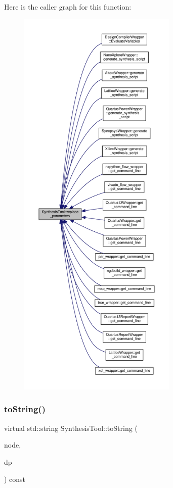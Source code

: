 Here is the caller graph for this function\+:
\nopagebreak
\begin{figure}[H]
\begin{center}
\leavevmode
\includegraphics[height=550pt]{d9/de0/classSynthesisTool_a96fbad52c8ebfe4b2685c2f47d824fa2_icgraph}
\end{center}
\end{figure}
\mbox{\label{classSynthesisTool_a98c5ba46f950300e1a5ca7cfcb409852}} 
\subsubsection{\texorpdfstring{to\+String()}{toString()}}
{\footnotesize\ttfamily virtual std\+::string Synthesis\+Tool\+::to\+String (\begin{DoxyParamCaption}\item[{const \hyperlink{xml__script__command_8hpp_a1fe3d50ade66bc35e41be9b68bbbcd02}{xml\+\_\+script\+\_\+node\+\_\+t\+Ref}}]{node,  }\item[{const \hyperlink{DesignParameters_8hpp_ae36bb1c4c9150d0eeecfe1f96f42d157}{Design\+Parameters\+Ref}}]{dp }\end{DoxyParamCaption}) const\hspace{0.3cm}{\ttfamily [pure virtual]}}



